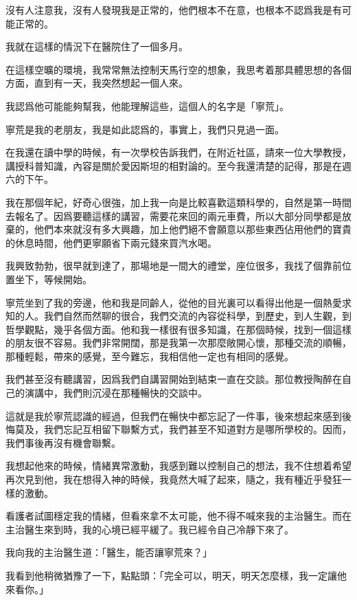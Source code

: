 沒有人注意我，沒有人發現我是正常的，他們根本不在意，也根本不認爲我是有可能正常的。

我就在這樣的情況下在醫院住了一個多月。



在這樣空曠的環境，我常常無法控制天馬行空的想象，我思考着那具體思想的各個方面，直到有一天，我突然想起一個人來。

我認爲他可能能夠幫我，他能理解這些，這個人的名字是「寧荒」。

寧荒是我的老朋友，我是如此認爲的，事實上，我們只見過一面。

在我還在讀中學的時候，有一次學校告訴我們，在附近社區，請來一位大學教授，講授科普知識，內容是關於愛因斯坦的相對論的。至今我還清楚的記得，那是在週六的下午。

我在那個年紀，好奇心很強，加上我一向是比較喜歡這類科學的，自然是第一時間去報名了。因爲要聽這樣的講習，需要花來回的兩元車費，所以大部分同學都是放棄的，他們本來就沒有多大興趣，加上他們絕不會願意以那些東西佔用他們的寶貴的休息時間，他們更寧願省下兩元錢來買汽水喝。

我興致勃勃，很早就到達了，那場地是一間大的禮堂，座位很多，我找了個靠前位置坐下，等候開始。

寧荒坐到了我的旁邊，他和我是同齡人，從他的目光裏可以看得出他是一個熱愛求知的人。我們自然而然聊的很合，我們交流的內容從科學，到歷史，到人生觀，到哲學觀點，幾乎各個方面。他和我一樣很有很多知識，在那個時候，找到一個這樣的朋友很不容易。我們非常開闊，那是我第一次那麼敞開心懷，那種交流的順暢，那種輕鬆，帶來的感覺，至今難忘，我相信他一定也有相同的感覺。

我們甚至沒有聽講習，因爲我們自講習開始到結束一直在交談。那位教授陶醉在自己的演講中，我們則沉浸在那種暢快的交談中。

這就是我於寧荒認識的經過，但我們在暢快中都忘記了一件事，後來想起來感到後悔莫及，我們忘記互相留下聯繫方式，我們甚至不知道對方是哪所學校的。因而，我們事後再沒有機會聯繫。



我想起他來的時候，情緒異常激動，我感到難以控制自己的想法，我不住想着希望再次見到他，我在想得入神的時候，我竟然大喊了起來，隨之，我有種近乎發狂一樣的激動。

看護者試圖穩定我的情緒，但看來拿不太可能，他不得不喊來我的主治醫生。而在主治醫生來到時，我的心境已經平緩了。我已經令自己冷靜下來了。

我向我的主治醫生道：「醫生，能否讓寧荒來？」

我看到他稍微猶豫了一下，點點頭：「完全可以，明天，明天怎麼樣，我一定讓他來看你。」

